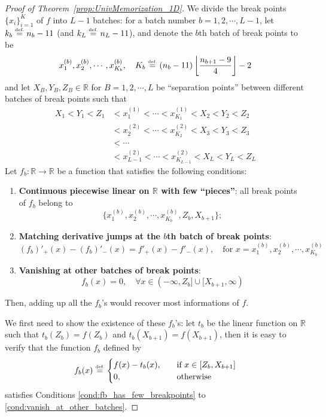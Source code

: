 \documentclass{article}
\numberwithin{equation}{section}
\theoremstyle{definition}
\newcommand{\eqdef}{\ensuremath{\stackrel{\mbox{\upshape\tiny def.}}{=}}}
\begin{document}
\begin{proof}[{Proof of Theorem~\ref{prop:UnivMemorization_1D}}]
We divide the break points $\{x_i\}_{i=1}^K$ of $f$ into $L-1$ batches: for a batch number $b=1,2,\cdots,L-1$, let $k_b \eqdef n_b - 11$ (and $k_L \eqdef n_L - 11$), and denote the $b$th batch of break points to be 
\[
    x_1^{(b)},x_2^{(b)},\cdots,x_{K_b}^{(b)}, \quad
    K_b \eqdef (n_b-11) 
        \left\lfloor \frac{n_{b+1}-9}{4} \right\rfloor - 2
\]
and let $X_B,Y_B,Z_B\in\mathbb{R}$ for $B=1,2,\cdots,L$ be ``separation points'' between different batches of break points such that
\begin{align*}
    X_1 < Y_1 < Z_1 
    &< x_1^{(1)}<\cdots<x_{K_1}^{(1)}
    < X_2 < Y_2 < Z_2 
    \\
    &< x_2^{(2)}<\cdots<x_{K_2}^{(2)}
    < X_3 < Y_3 < Z_3 
    \\
    &< \cdots  
    \\
    &< x_{L-1}^{(2)}<\cdots<x_{K_{L-1}}^{(2)}
    < X_L < Y_L < Z_L 
\end{align*}
Let $f_b:\mathbb{R} \rightarrow \mathbb{R}$ be a function that satisfies the following conditions:
\begin{enumerate}
    \item \label{cond:fb_has_few_breakpoints} \textbf{Continuous piecewise linear on $\mathbb{R}$ with few ``pieces''}: all break points of $f_b$ belong to 
    \[
        \big\{ x_1^{(b)},x_2^{(b)},\cdots,x_{K_b}^{(b)}, Z_b, X_{b+1} \big\}
    ;
    \]
    \item \label{cond:match_jumps_at_bth_batch} \textbf{Matching derivative jumps at the $b$th batch of break points}: 
    \[
        (f_b)'_+ (x) - (f_b)'_- (x)
        =
        f'_+ (x) - f'_- (x),
        \quad
        \text{for } x = x_1^{(b)},x_2^{(b)},\cdots,x_{K_b}^{(b)}
    \]
    \item \label{cond:vanish_at_other_batches} \textbf{Vanishing at other batches of break points}: 
    \[
        f_b(x) = 0,
        \quad
        \forall x\in (-\infty, Z_b] \cup [X_{b+1}, \infty)
    \]
\end{enumerate}
Then, adding up all the $f_b$'s would recover most informations of $f$. 

We first need to show the existence of these $f_b$'s: let $t_b$ be the linear function on $\mathbb{R}$ such that $t_b(Z_b) = f(Z_b)$ and $t_b(X_{b+1}) = f(X_{b+1})$, then it is easy to verify that the function $f_b$ defined by 
\[
    f_b(x) \eqdef 
    \begin{cases}
        f(x) - t_b(x), \quad &\text{if } x \in [Z_b, X_{b+1}]  \\
        0,             \quad &\text{otherwise}
    \end{cases}
\]
satisfies Conditions \ref{cond:fb_has_few_breakpoints} to \ref{cond:vanish_at_other_batches}. 



\end{proof}
\end{document}

